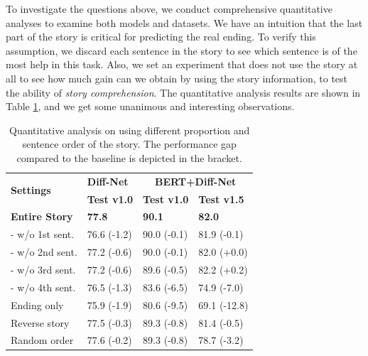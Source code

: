 \documentclass[letterpaper]{article} %
\begin{document}
To investigate the questions above, we conduct comprehensive quantitative analyses to examine both models and datasets. 
We have an intuition that the last part of the story is critical for predicting the real ending. 
To verify this assumption, we discard each sentence in the story to see which sentence is of the most help in this task. 
Also, we set an experiment that does not use the story at all to see how much gain can we obtain by using the story information, to test the ability of {\em story comprehension}.
The quantitative analysis results are shown in Table \ref{ablation-context}, and we get some unanimous and interesting observations.

\begin{table}[tbp]
\small
\begin{center}
\begin{tabular}{p{1.9cm} l l l}
\toprule
\multirow{2}{*}{\bf Settings} 	& {\centering \bf Diff-Net} & \multicolumn{2}{c}{\centering \bf BERT+Diff-Net} \\
							& {\bf Test v1.0} & {\bf Test v1.0} & {\bf Test v1.5}  \\
\midrule
\bf Entire Story 		 		& \bf 77.8 & \bf 90.1 & \bf 82.0 \\
- w/o 1st sent. 				& 76.6 {\small(-1.2)} & 90.0 {\small(-0.1)} & 81.9 {\small(-0.1)} \\
- w/o 2nd sent. 				& 77.2 {\small(-0.6)} & 90.0 {\small(-0.1)} &  82.0 {\small(+0.0)} \\	
- w/o 3rd sent. 				& 77.2 {\small(-0.6)} & 89.6 {\small(-0.5) }& 82.2 {\small(+0.2)} \\
- w/o 4th sent. 				& 76.5 {\small(-1.3)} & 83.6 {\small(-6.5)} &  74.9 {\small(-7.0)} \\
\midrule
Ending only		  			& 75.9 {\small(-1.9)} & 80.6 {\small(-9.5)} & 69.1 {\small(-12.8)} \\ 
Reverse story					& 77.5 {\small(-0.3)} & 89.3 {\small(-0.8)} & 81.4 {\small(-0.5)} \\
Random order		 			& 77.6 {\small(-0.2)} & 89.3 {\small(-0.8)} & 78.7 {\small(-3.2)} \\
\bottomrule
\end{tabular}
\end{center}
\caption{\label{ablation-context} Quantitative analysis on using different proportion and sentence order of the story. The performance gap compared to the baseline is depicted in the bracket.}
\end{table}
\end{document}
